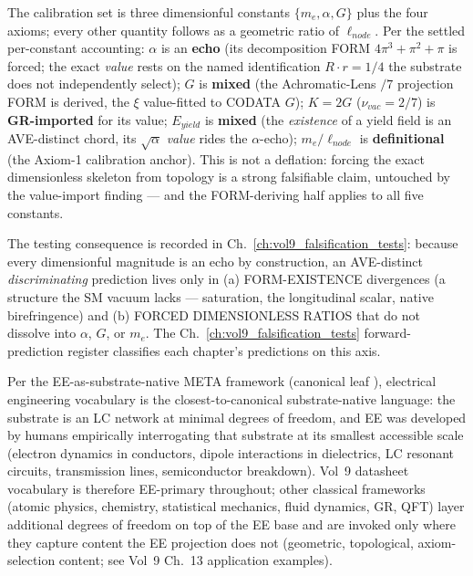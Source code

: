 The calibration set is three dimensionful constants $\{m_e, \alpha, G\}$ plus the four axioms; every other quantity follows as a geometric ratio of $\ell_{node}$. Per the settled per-constant accounting: $\alpha$ is an \textbf{echo} (its decomposition FORM $4\pi^3 + \pi^2 + \pi$ is forced; the exact \emph{value} rests on the named identification $R\cdot r = 1/4$ the substrate does not independently select); $G$ is \textbf{mixed} (the Achromatic-Lens $/7$ projection FORM is derived, the $\xi$ value-fitted to CODATA $G$); $K = 2G$ ($\nu_{vac} = 2/7$) is \textbf{GR-imported} for its value; $E_{yield}$ is \textbf{mixed} (the \emph{existence} of a yield field is an AVE-distinct chord, its $\sqrt{\alpha}$ \emph{value} rides the $\alpha$-echo); $m_e/\ell_{node}$ is \textbf{definitional} (the Axiom-1 calibration anchor). This is not a deflation: forcing the exact dimensionless skeleton from topology is a strong falsifiable claim, untouched by the value-import finding --- and the FORM-deriving half applies to all five constants.

The testing consequence is recorded in Ch.~\ref{ch:vol9_falsification_tests}: because every dimensionful magnitude is an echo by construction, an AVE-distinct \emph{discriminating} prediction lives only in (a) FORM-EXISTENCE divergences (a structure the SM vacuum lacks --- saturation, the longitudinal scalar, native birefringence) and (b) FORCED DIMENSIONLESS RATIOS that do not dissolve into $\alpha$, $G$, or $m_e$. The Ch.~\ref{ch:vol9_falsification_tests} forward-prediction register classifies each chapter's predictions on this axis.

Per the EE-as-substrate-native META framework (canonical leaf ), electrical engineering vocabulary is the closest-to-canonical substrate-native language: the substrate is an LC network at minimal degrees of freedom, and EE was developed by humans empirically interrogating that substrate at its smallest accessible scale (electron dynamics in conductors, dipole interactions in dielectrics, LC resonant circuits, transmission lines, semiconductor breakdown). Vol~9 datasheet vocabulary is therefore EE-primary throughout; other classical frameworks (atomic physics, chemistry, statistical mechanics, fluid dynamics, GR, QFT) layer additional degrees of freedom on top of the EE base and are invoked only where they capture content the EE projection does not (geometric, topological, axiom-selection content; see Vol~9 Ch.~13 application examples).

